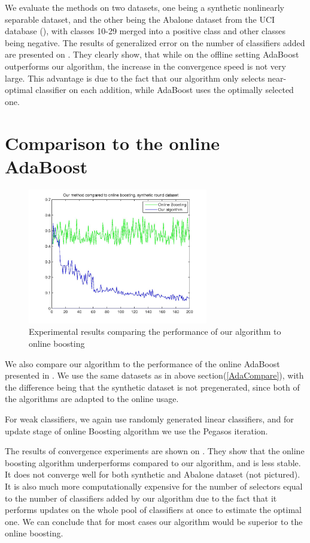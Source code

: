 We evaluate the methods on two datasets, one being a synthetic nonlinearly separable dataset, and the other  being the Abalone dataset from the UCI database (\cite{frafra}), with classes 10-29 merged into a positive class and other classes being negative. The results of generalized error on the number of classifiers added are presented on . They clearly show, that while on the offline setting AdaBoost outperforms our algorithm, the increase in the convergence speed is not very large. This advantage is due to the fact that our algorithm only selects near-optimal classifier on each addition, while AdaBoost uses the optimally selected one. 
\section{Comparison to the online AdaBoost}
\begin{figure}[t]
		\centering
		\includegraphics[width=0.7\textwidth]{odas}
		\caption{Experimental results comparing the performance of our algorithm to online boosting}
		\label{odacom}
	\end{figure}

We also compare our algorithm to the performance of the online AdaBoost presented in \cite{OnlineBoost}. We use the same datasets as in above section(\ref{AdaCompare}), with the difference being that the synthetic dataset is not pregenerated, since both of the algorithms are adapted to the online usage. 

For weak classifiers, we again use randomly generated linear classifiers, and for update stage of online Boosting algorithm we use the Pegasos iteration. 

The results of convergence experiments are shown on . They show that the online boosting algorithm underperforms compared to our algorithm, and is less stable. It does not converge well for both synthetic and Abalone dataset (not pictured).
It is also much more computationally expensive for the number of selectors equal to the number of classifiers added by our algorithm due to the fact that it performs updates on the whole pool of classifiers at once to estimate the optimal one. We can conclude that for most cases our algorithm would be superior to the online boosting.




